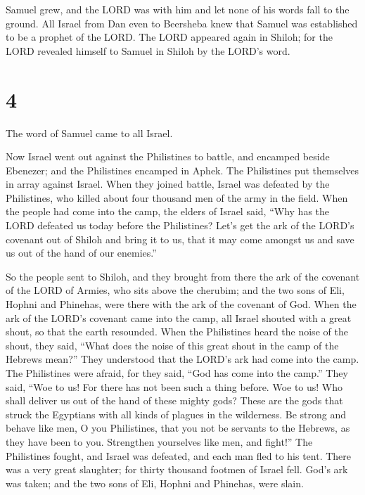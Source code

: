 Samuel grew, and the LORD was with him and let none of
his words fall to the ground.  All Israel from Dan even
to Beersheba knew that Samuel was established to be a prophet of the
LORD.  The LORD appeared again in Shiloh; for the LORD
revealed himself to Samuel in Shiloh by the LORD's word.

\hypertarget{section-3}{%
\section{4}\label{section-3}}

 The word of Samuel came to all Israel.

Now Israel went out against the Philistines to battle, and encamped
beside Ebenezer; and the Philistines encamped in Aphek. 
The Philistines put themselves in array against Israel. When they joined
battle, Israel was defeated by the Philistines, who killed about four
thousand men of the army in the field.  When the people
had come into the camp, the elders of Israel said, ``Why has the LORD
defeated us today before the Philistines? Let's get the ark of the
LORD's covenant out of Shiloh and bring it to us, that it may come
amongst us and save us out of the hand of our enemies.''

 So the people sent to Shiloh, and they brought from there
the ark of the covenant of the LORD of Armies, who sits above the
cherubim; and the two sons of Eli, Hophni and Phinehas, were there with
the ark of the covenant of God.  When the ark of the
LORD's covenant came into the camp, all Israel shouted with a great
shout, so that the earth resounded.  When the Philistines
heard the noise of the shout, they said, ``What does the noise of this
great shout in the camp of the Hebrews mean?'' They understood that the
LORD's ark had come into the camp.  The Philistines were
afraid, for they said, ``God has come into the camp.'' They said, ``Woe
to us! For there has not been such a thing before.  Woe to
us! Who shall deliver us out of the hand of these mighty gods? These are
the gods that struck the Egyptians with all kinds of plagues in the
wilderness.  Be strong and behave like men, O you
Philistines, that you not be servants to the Hebrews, as they have been
to you. Strengthen yourselves like men, and fight!''  The
Philistines fought, and Israel was defeated, and each man fled to his
tent. There was a very great slaughter; for thirty thousand footmen of
Israel fell.  God's ark was taken; and the two sons of
Eli, Hophni and Phinehas, were slain.


